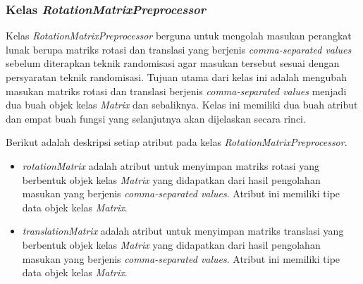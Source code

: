\subsubsection{Kelas \textit{RotationMatrixPreprocessor}}
\label{subsubsec:kelas-rotationpre}

Kelas \textit{RotationMatrixPreprocessor} berguna untuk mengolah masukan perangkat lunak berupa matriks rotasi dan translasi yang berjenis \textit{comma-separated values} sebelum diterapkan teknik randomisasi agar masukan tersebut sesuai dengan persyaratan teknik randomisasi. Tujuan utama dari kelas ini adalah mengubah masukan matriks rotasi dan translasi berjenis \textit{comma-separated values} menjadi dua buah objek kelas \textit{Matrix} dan sebaliknya. Kelas ini memiliki dua buah atribut dan empat buah fungsi yang selanjutnya akan dijelaskan secara rinci.

Berikut adalah deskripsi setiap atribut pada kelas \textit{RotationMatrixPreprocessor}.
\begin{itemize}
	\item \textit{rotationMatrix} adalah atribut untuk menyimpan matriks rotasi yang berbentuk objek kelas \textit{Matrix} yang didapatkan dari hasil pengolahan masukan yang berjenis \textit{comma-separated values}. Atribut ini memiliki tipe data objek kelas \textit{Matrix}.
	\item \textit{translationMatrix} adalah atribut untuk menyimpan matriks translasi yang berbentuk objek kelas \textit{Matrix} yang didapatkan dari hasil pengolahan masukan yang berjenis \textit{comma-separated values}. Atribut ini memiliki tipe data objek kelas \textit{Matrix}.
\end{itemize}

